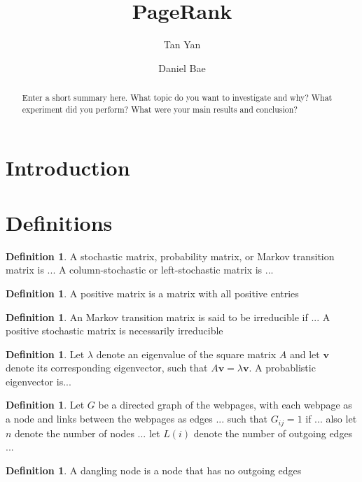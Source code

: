 \documentclass[11pt]{article}
\title{PageRank}
\author{Tan Yan \and Daniel Bae}
\theoremstyle{definition}
\newtheorem{definition}[theorem]{Definition}
\renewcommand{\vec}[1]{\mathbf{#1}}
\begin{document}
\maketitle
\begin{abstract}
Enter a short summary here. What topic do you want to investigate and why? What experiment did you perform? What were your main results and conclusion?
\end{abstract}

\section{Introduction}

\section{Definitions}
\begin{definition}
    A stochastic matrix, probability matrix, or Markov transition matrix is ...
    A column-stochastic or left-stochastic matrix is ...
\end{definition}

\begin{definition}
    A positive matrix is a matrix with all positive entries
\end{definition}

\begin{definition}
    An Markov transition matrix is said to be irreducible if ...
    A positive stochastic matrix is necessarily irreducible
\end{definition}

\begin{definition}
    Let $\lambda$ denote an eigenvalue of the square matrix $A$ and let $\vec{v}$ denote its corresponding eigenvector, such that $A \vec{v} = \lambda \vec{v}$.
    A probablistic eigenvector is...
\end{definition}

\begin{definition}
    Let $G$ be a directed graph of the webpages, with each webpage as a node and links between the webpages as edges ... such that $G_{ij} = 1$ if ...
    also let $n$ denote the number of nodes ...
    let $L(i)$ denote the number of outgoing edges ...
\end{definition}

\begin{definition}
    A dangling node is a node that has no outgoing edges
\end{definition}
\end{document}
